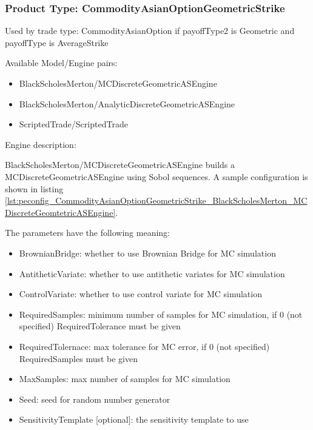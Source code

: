 \subsubsection{Product Type: CommodityAsianOptionGeometricStrike}

Used by trade type: CommodityAsianOption if payoffType2 is Geometric and payoffType is AverageStrike

Available Model/Engine pairs:

\begin{itemize}
  \item BlackScholesMerton/MCDiscreteGeometricASEngine
  \item BlackScholesMerton/AnalyticDiscreteGeometricASEngine
  \item ScriptedTrade/ScriptedTrade
\end{itemize}

Engine description:

BlackScholesMerton/MCDiscreteGeometricASEngine builds a MCDiscreteGeometricASEngine using Sobol sequences. A sample
configuration is shown in listing
\ref{lst:peconfig_CommodityAsianOptionGeometricStrike_BlackScholesMerton_MCDiscreteGeomtetricASEngine}.

The parameters have the following meaning:

\begin{itemize}
\item BrownianBridge: whether to use Brownian Bridge for MC simulation
\item AntitheticVariate: whether to use antithetic variates for MC simulation
\item ControlVariate: whether to use control variate for MC simulation
\item RequiredSamples: minimum number of samples for MC simulation, if 0 (not specified) RequiredTolerance must be given
\item RequiredTolernace: max tolerance for MC error, if 0 (not specified) RequiredSamples must be given
\item MaxSamples: max number of samples for MC simulation
\item Seed: seed for random number generator
\item SensitivityTemplate [optional]: the sensitivity template to use 
\end{itemize}

